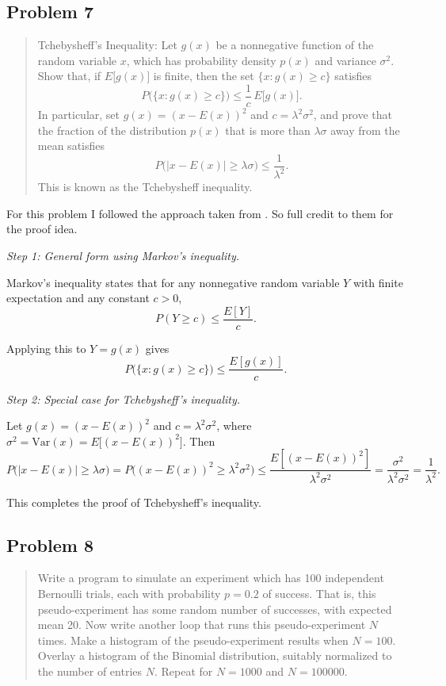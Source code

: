 \documentclass[10pt]{article}
\begin{document}
\subsection*{Problem 7}
\begin{quote}
	Tchebysheff's Inequality: Let $g(x)$ be a nonnegative function of the random variable $x$, which has probability density $p(x)$ and variance $\sigma^2$. Show that, if $E\big[g(x)\big]$ is finite, then the set $\{x: g(x)\ge c\}$ satisfies
	\[
		P\big(\{x: g(x)\ge c\}\big) \le \frac{1}{c}\, E\big[g(x)\big].
	\]
	In particular, set $g(x)=(x-E(x))^2$ and $c=\lambda^2\sigma^2$, and prove that the fraction of the distribution $p(x)$ that is more than $\lambda\sigma$ away from the mean satisfies
	\[
		P\big(|x-E(x)|\ge \lambda\sigma\big) \le \frac{1}{\lambda^2}.
	\]
	This is known as the Tchebysheff inequality.
\end{quote}

\divider

For this problem I followed the approach taken from \cite{statproofbook2023cheb}. So full credit to them for the proof idea.

\textit{Step 1: General form using Markov's inequality.}

Markov's inequality states that for any nonnegative random variable $Y$ with finite expectation and any constant $c>0$,
\[
	P(Y \ge c) \le \frac{E[Y]}{c}.
\]

Applying this to $Y = g(x)$ gives
\[
	P\big(\{x: g(x) \ge c\}\big) \le \frac{E[g(x)]}{c}.
\]

\textit{Step 2: Special case for Tchebysheff's inequality.}

Let $g(x) = (x - E(x))^2$ and $c = \lambda^2 \sigma^2$, where $\sigma^2 = \mathrm{Var}(x) = E\big[(x - E(x))^2\big]$. Then
\[
	P\big(|x - E(x)| \ge \lambda \sigma \big)
	= P\big((x - E(x))^2 \ge \lambda^2 \sigma^2 \big)
	\le \frac{E[(x - E(x))^2]}{\lambda^2 \sigma^2}
	= \frac{\sigma^2}{\lambda^2 \sigma^2}
	= \frac{1}{\lambda^2}.
\]

This completes the proof of Tchebysheff's inequality.

\subsection*{Problem 8}
\begin{quote}
	Write a program to simulate an experiment which has 100 independent Bernoulli trials, each with probability $p=0.2$ of success. That is, this pseudo-experiment has some random number of successes, with expected mean 20. Now write another loop that runs this pseudo-experiment $N$ times. Make a histogram of the pseudo-experiment results when $N=100$. Overlay a histogram of the Binomial distribution, suitably normalized to the number of entries $N$. Repeat for $N=1000$ and $N=100000$.
\end{quote}
\end{document}
